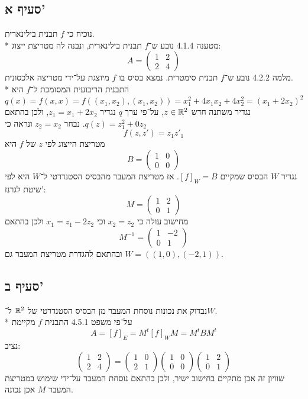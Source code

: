 \subsection{סעיף א'}
נוכיח כי $f$ תבנית בילינארית. \\*
מטענה 4.1.4 נובע ש־$f$ תבנית בילינארית, ונבנה לה מטריצת ייצוג:
\[
	A = \begin{pmatrix}
		1 & 2 \\
		2 & 4
	\end{pmatrix}
\]
מלמה 4.2.2 נובע ש־$f$ תבנית סימטרית.
נמצא בסיס בו $f$ מיוצגת על־ידי מטריצה אלכסונית. \\*
התבנית הריבועית המסומכת ל־$f$ היא
\[
	q(x) = f(x, x) = f((x_1, x_2), (x_1, x_2)) = x_1^2 + 4x_1 x_2 + 4 x_2^2 = (x_1 + 2x_2)^2
\]
נגדיר משתנה חדש $z \in \mathbb{R}^2$, על־פי ערך $q$ נגדיר $z_1 = x_1 + 2x_2$, ולכן בהתאם $q(z) = z_1^2 + 0z_2$.
נבחר $z_2 = x_2$ ונראה כי
\[
	f(z, z') = z_1 z'_1
\]
מטריצת הייצוג לפי $z$ של $f$ היא
\[
	B = \begin{pmatrix}
		1 & 0 \\
		0 & 0
	\end{pmatrix}
\]
נגדיר $W$ הבסיס שמקיים $[f]_W = B$. אז מטריצת המעבר מהבסיס הסטנדרטי ל־$W$ היא לפי שיטת לגרנז':
\[
	M = \begin{pmatrix}
		1 & 2 \\
		0 & 1
	\end{pmatrix}
\]
מחישוב עולה כי $x_2 = z_2$ וכי $x_1 = z_1 - 2z_2$ ולכן בהתאם
\[
	M^{-1} = \begin{pmatrix}
		1 & -2 \\
		0 & 1
	\end{pmatrix}
\]
ובהתאם להגדרת מטריצת המעבר גם $W = ((1, 0), (-2, 1))$.

\subsection{סעיף ב'}
נבדוק את נכונות נוסחת המעבר מן הבסיס הסטנדרטי של $\mathbb{R}^2$ ל־$W$. \\*
על־פי משפט 4.5.1 התבנית $f$ מקיימת
\[
	A = [f]_E = M^t [f]_W M = M^t B M^t
\]
נציב:
\[
	\begin{pmatrix}
		1 & 2 \\
		2 & 4
	\end{pmatrix}
	=
	\begin{pmatrix}
		1 & 0 \\
		2 & 1
	\end{pmatrix}
	\begin{pmatrix}
		1 & 0 \\
		0 & 0
	\end{pmatrix}
	\begin{pmatrix}
		1 & 2 \\
		0 & 1
	\end{pmatrix}
\]
שוויון זה אכן מתקיים בחישוב ישיר, ולכן בהתאם נוסחת המעבר על־ידי שימוש במטריצת המעבר $M$ אכן נכונה.

